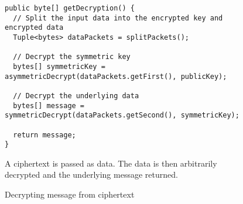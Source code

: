 \begin{figure}[H]
  \centering
  \begin{verbatim}
public byte[] getDecryption() {
  // Split the input data into the encrypted key and encrypted data
  Tuple<bytes> dataPackets = splitPackets();

  // Decrypt the symmetric key
  bytes[] symmetricKey = asymmetricDecrypt(dataPackets.getFirst(), publicKey);

  // Decrypt the underlying data
  bytes[] message = symmetricDecrypt(dataPackets.getSecond(), symmetricKey);

  return message;
}
  \end{verbatim}
  \caption{
  	Decrypting message from ciphertext
  }{
  	A ciphertext is passed as data. The data is then arbitrarily decrypted and the underlying message returned.
  }
  \label{code:decrypt_data}
\end{figure}
